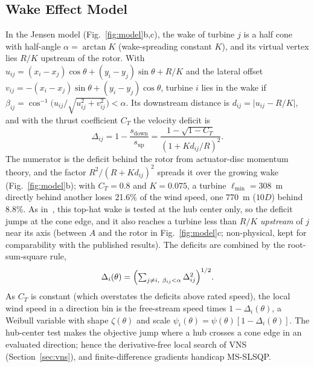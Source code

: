 \subsection{Wake Effect Model}
In the Jensen model (Fig.~\ref{fig:model}b,c), the wake of turbine $j$ is a half cone with half-angle $\alpha=\arctan K$ (wake-spreading constant $K$), and its virtual vertex lies $R/K$ upstream of the rotor. With $u_{ij}=(x_i - x_j)\cos\theta + (y_i - y_j)\sin\theta + R/K$ and the lateral offset $v_{ij}=-(x_i - x_j)\sin\theta + (y_i - y_j)\cos\theta$, turbine $i$ lies in the wake if $\beta_{ij}=\cos^{-1}\!\bigl(u_{ij}/\sqrt{u_{ij}^2+v_{ij}^2}\bigr)<\alpha$. Its downstream distance is $d_{ij}=\lvert u_{ij}-R/K\rvert$, and with the thrust coefficient $C_T$ the velocity deficit is
\begin{equation}
    \Delta_{ij} = 1-\frac{s_{\text{down}}}{s_{\text{up}}}=\frac{1 - \sqrt{1 - C_T}}{\left(1 + K d_{ij}/R\right)^2}.
    \label{eq:deficit}
\end{equation}
The numerator is the deficit behind the rotor from actuator-disc momentum theory, and the factor $R^2/(R+Kd_{ij})^2$ spreads it over the growing wake (Fig.~\ref{fig:model}b); with $C_T=0.8$ and $K=0.075$, a turbine $\ell_{\min}=308$~m directly behind another loses 21.6\% of the wind speed, one 770~m ($10D$) behind 8.8\%.
As in~\cite{Kusiak2010}, this top-hat wake is tested at the hub center only, so the deficit jumps at the cone edge, and it also reaches a turbine less than $R/K$ \emph{upstream} of $j$ near its axis (between $A$ and the rotor in Fig.~\ref{fig:model}c; non-physical, kept for comparability with the published results). The deficits are combined by the root-sum-square rule,
\begin{equation}\label{eq5}
\Delta_i(\theta) = \Bigl( \textstyle\sum_{j \ne i,\ \beta_{ij} < \alpha} \Delta_{ij}^2 \Bigr)^{1/2} .
\end{equation}
As $C_T$ is constant (which overstates the deficits above rated speed), the local wind speed in a direction bin is the free-stream speed times $1-\Delta_i(\theta)$, a Weibull variable with shape $\zeta(\theta)$ and scale $\psi_i(\theta)=\psi(\theta)[1-\Delta_i(\theta)]$. The hub-center test makes the objective jump where a hub crosses a cone edge in an evaluated direction; hence the derivative-free local search of VNS (Section~\ref{sec:vns}), and finite-difference gradients handicap MS-SLSQP.

